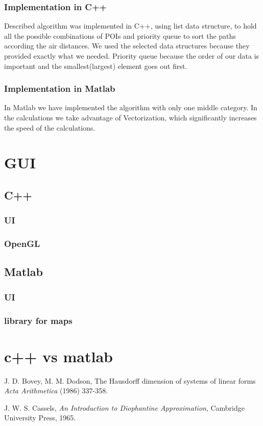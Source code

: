 \documentclass[reqno,openany,12pt]{amsbook}
\theoremstyle{definition}
\theoremstyle{remark}
\begin{document}
\subsection{Implementation in C++}
Described algorithm was implemented in C++, using list data structure, to hold all the possible combinations of POIs and priority queue to sort the paths according the air distances. We used the selected data structures because they provided exactly what we needed. Priority queue because the order of our data is important and the smallest(largest) element goes out first. 
\subsection{Implementation in Matlab}
In Matlab we have implemented the algorithm with only one middle category. In the calculations we take advantage of Vectorization, which significantly increases the speed of the calculations.    
\chapter{GUI}
\section{C++}
\subsection{UI}
\subsection{OpenGL}
\section{Matlab}
\subsection{UI}
\subsection{library for maps}
\chapter{c++ vs matlab}




\begin{thebibliography}{99}

J. D. Bovey, M. M. Dodson,
The Hausdorff dimension of systems of linear forms
{\em Acta Arithmetica}
(1986) 337-358.

J. W. S. Cassels,
{\em An Introduction to Diophantine Approximation},
Cambridge University Press, 1965.



\end{thebibliography}
\end{document}

